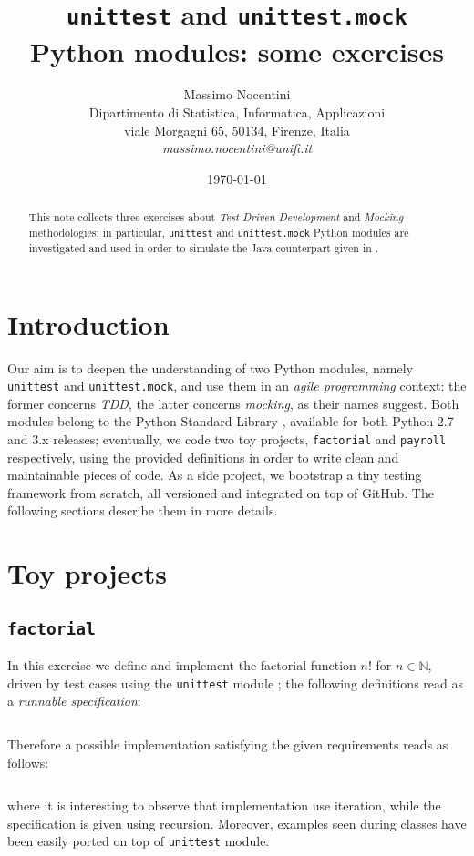 \documentclass[12pt]{article}
\begin{document}
\title{\texttt{unittest} and \texttt{unittest.mock}\\ Python modules: some exercises}
\author{Massimo Nocentini\\
Dipartimento di Statistica, Informatica, Applicazioni \\ 
viale Morgagni 65, 50134, Firenze, Italia \\ 
{\sl  massimo.nocentini@unifi.it}}

\date{\today}

\maketitle

\begin{abstract}

This note collects three exercises about \textit{Test-Driven Development}
and \textit{Mocking} methodologies; in particular, \texttt{unittest} and
\texttt{unittest.mock} Python modules are investigated and used
in order to simulate the Java counterpart given in \cite{course}. 
 
\end{abstract}

\section{Introduction}

Our aim is to deepen the understanding of two Python modules, namely
\texttt{unittest} and \texttt{unittest.mock}, and use them in an \emph{agile
programming} context: the former concerns \textit{TDD}, the latter concerns
\textit{mocking}, as their names suggest.  Both modules belong to the Python
Standard Library \cite{psl}, available for both Python 2.7 and 3.x releases;
eventually, we code two toy projects, \texttt{factorial} and \texttt{payroll}
respectively, using the provided definitions in order to write clean and
maintainable pieces of code.  As a side project, we bootstrap a tiny testing
framework from scratch, all versioned and integrated on top of GitHub. The
following sections describe them in more details.

\section{Toy projects}

\subsection{\texttt{factorial}}
In this exercise we define and implement the factorial function $n!$ for $n\in\mathbb{N}$,
driven by test cases using the \texttt{unittest} module \cite{unittest}; 
the following definitions read as a \emph{runnable specification}:
\inputminted{python}{../factorial/factorial_test.py}
Therefore a possible implementation satisfying the given requirements reads as follows:
\inputminted{python}{../factorial/factorial.py}
where it is interesting to observe that implementation use iteration, while the specification
is given using recursion. Moreover, examples seen during classes have been easily ported on top
of \texttt{unittest} module.
\end{document}
